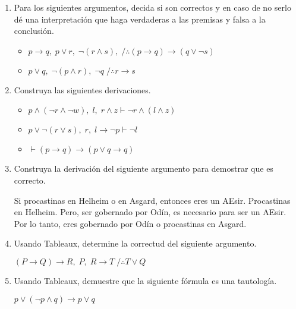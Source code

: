 \documentclass[letterpaper,11pt]{article}
\begin{document}
\begin{enumerate}
    \item Para los siguientes argumentos, decida si son correctos y en caso de 
    no serlo dé una interpretación que haga verdaderas a las premisas y falsa 
    a la conclusión.

    \begin{itemize}
        \item $p → q, \; p \lor r, \; \neg (r \land s), \; /∴ (p → q) → 
               (q \lor \neg s)$
        \item $p \lor q, \; \neg (p \land r), \; \neg q \; /∴ r → s$
    \end{itemize}

    \item Construya las siguientes derivaciones.

    \begin{itemize}
        \item $p \land (\neg r \land \neg w), \; l, \; r \land z ⊢ \neg r 
               \land (l \land z)$
        \item $p \lor \neg(r \lor s), \; r, \; l → \neg p ⊢ \neg l$
        \item $⊢(p → q) → (p \lor q → q)$
    \end{itemize}

    \item Construya la derivación del siguiente argumento para demostrar que es 
    correcto.

    Si procastinas en Helheim o en Asgard, entonces eres un AEsir. Procastinas 
    en Helheim. Pero, ser gobernado por Odín, es necesario para ser un AEsir. 
    Por lo tanto, eres gobernado por Odín o procastinas en Asgard.

    \item Usando Tableaux, determine la correctud del siguiente argumento.

    \begin{center}
        $(P → Q) → R, \; P, \; R → T \; /∴ T \lor Q$
    \end{center}

    \item Usando Tableaux, demuestre que la siguiente fórmula es una tautología.

    \begin{center}
        $p \lor (\neg p \land q) → p \lor q$
    \end{center}
\end{enumerate}
\end{document}
